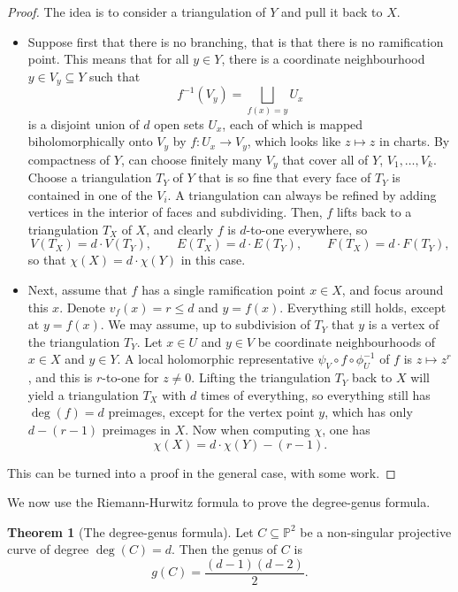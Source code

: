 \documentclass{article}
\renewcommand{\P}{\mathbb{P}}
\newcommand{\rb}[1]{\left( #1 \right)}
\theoremstyle{definition}\newtheorem{definition}{Definition}[section]
\theoremstyle{definition}\newtheorem{notation}[definition]{Notation}
\theoremstyle{definition}\newtheorem{remark}[definition]{Remark}
\theoremstyle{definition}\newtheorem{example1}[definition]{Example}
\theoremstyle{definition}\newtheorem{fact}{Fact}
\theoremstyle{definition}\newtheorem{exercise}{Exercise}
\theoremstyle{definition}\newtheorem*{example2}{Example}
\newtheorem{theorem}[definition]{Theorem}
\begin{document}
\begin{proof}
The idea is to consider a triangulation of $ Y $ and pull it back to $ X $.
\begin{itemize}
\item Suppose first that there is no branching, that is that there is no ramification point. This means that for all $ y \in Y $, there is a coordinate neighbourhood $ y \in V_y \subseteq Y $ such that
$$ f^{-1}\rb{V_y} = \bigsqcup_{f\rb{x} = y} U_x $$
is a disjoint union of $ d $ open sets $ U_x $, each of which is mapped biholomorphically onto $ V_y $ by $ f : U_x \to V_y $, which looks like $ z \mapsto z $ in charts. By compactness of $ Y $, can choose finitely many $ V_y $ that cover all of $ Y $, $ V_1, \dots, V_k $. Choose a triangulation $ T_Y $ of $ Y $ that is so fine that every face of $ T_Y $ is contained in one of the $ V_i $. A triangulation can always be refined by adding vertices in the interior of faces and subdividing. Then, $ f $ lifts back to a triangulation $ T_X $ of $ X $, and clearly $ f $ is $ d $-to-one everywhere, so
$$ V\rb{T_X} = d \cdot V\rb{T_Y}, \qquad E\rb{T_X} = d \cdot E\rb{T_Y}, \qquad F\rb{T_X} = d \cdot F\rb{T_Y}, $$
so that $ \chi\rb{X} = d \cdot \chi\rb{Y} $ in this case.
\item Next, assume that $ f $ has a single ramification point $ x \in X $, and focus around this $ x $. Denote $ v_f\rb{x} = r \le d $ and $ y = f\rb{x} $. Everything still holds, except at $ y = f\rb{x} $. We may assume, up to subdivision of $ T_Y $ that $ y $ is a vertex of the triangulation $ T_Y $. Let $ x \in U $ and $ y \in V $ be coordinate neighbourhoods of $ x \in X $ and $ y \in Y $. A local holomorphic representative $ \psi_V \circ f \circ \phi_U^{-1} $ of $ f $ is $ z \mapsto z^r $, and this is $ r $-to-one for $ z \ne 0 $. Lifting the triangulation $ T_Y $ back to $ X $ will yield a triangulation $ T_X $ with $ d $ times of everything, so everything still has $ \deg\rb{f} = d $ preimages, except for the vertex point $ y $, which has only $ d - \rb{r - 1} $ preimages in $ X $. Now when computing $ \chi $, one has
$$ \chi\rb{X} = d \cdot \chi\rb{Y} - \rb{r - 1}. $$
\end{itemize}
This can be turned into a proof in the general case, with some work.
\end{proof}

\pagebreak

We now use the Riemann-Hurwitz formula to prove the degree-genus formula.

\begin{theorem}[The degree-genus formula]
Let $ C \subseteq \P^2 $ be a non-singular projective curve of degree $ \deg\rb{C} = d $. Then the genus of $ C $ is
$$ g\rb{C} = \dfrac{\rb{d - 1}\rb{d - 2}}{2}. $$
\end{theorem}
\end{document}
